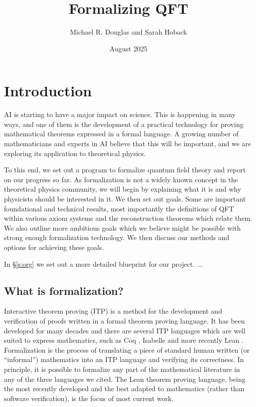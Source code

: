 \documentclass{article}
\title{Formalizing QFT}
\date{August 2025}
\author{Michael R. Douglas and Sarah Hoback}
\newcommand{\1}{\mathbbm{1}}
\theoremstyle{plain}
\theoremstyle{definition}
\numberwithin{equation}{section}
\begin{document}
\maketitle{}

\begin{abstract}
\end{abstract}
\vfill\eject

\iffalse\tableofcontents\fi

\newpage

\section{Introduction}
\label{s:intro}

AI is starting to have a major impact on science.  This is happening in many ways, and one of them is the development of a practical technology for proving mathematical theorems expressed in a formal language.  A growing number of mathematicians and experts in AI believe that this will be important, and we are exploring its application to theoretical physics.

To this end, we set out a program to formalize quantum field theory and report on our progress so far.  As formalization is not a widely known concept in the theoretical physics community, we will begin by explaining what it is and why physicists should be interested in it.  We then set out goals.  Some are important foundational and technical results, most importantly the definitions of QFT within various axiom systems and the reconstruction theorems which relate them.  We also outline more ambitious goals which we believe might be possible with strong enough formalization technology.
We then discuss our methods and options for achieving these goals.

In \S \ref{s:org} we set out a more detailed blueprint for our project. ...

\subsection{What is formalization?}
Interactive theorem proving (ITP) is a method for the development and verification of proofs written in a formal theorem proving language.  It has been developed for many decades and there are several ITP languages which are well suited to express mathematics, such as Coq \cite{}, Isabelle \cite{} and more recently Lean \cite{}.  Formalization is the process of translating a piece of standard human written (or ``informal'') mathematics into an ITP language and verifying its correctness.  In principle, it is possible to formalize any part of the mathematical literature in any of the three languages we cited.  The Lean theorem proving language, being the most recently developed and the best adapted to mathematics (rather than software verification), is the focus of most current work.  
\end{document}
